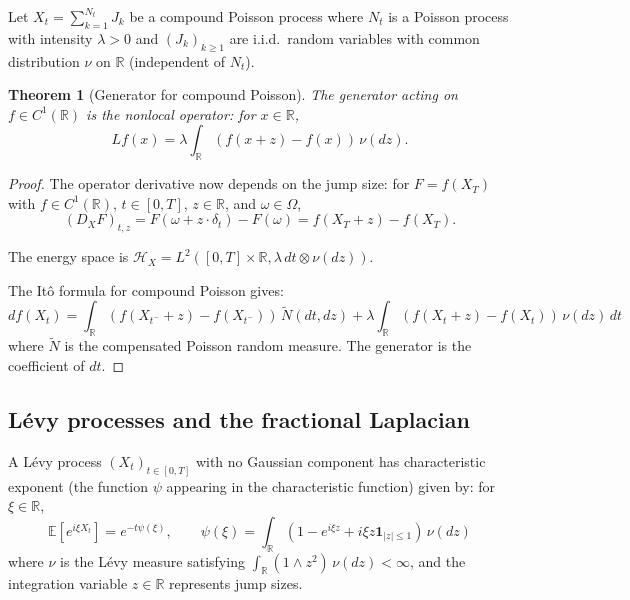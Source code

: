 \documentclass[12pt]{article}
\theoremstyle{plain}
\newtheorem{theorem}{Theorem}[section]
\theoremstyle{definition}
\theoremstyle{remark}
\newcommand{\E}{\mathbb{E}}
\newcommand{\R}{\mathbb{R}}
\newcommand{\HH}{\mathcal{H}}
\begin{document}
Let $X_t = \sum_{k=1}^{N_t} J_k$ be a compound Poisson process where $N_t$ is a Poisson process with intensity $\lambda > 0$ and $(J_k)_{k \geq 1}$ are i.i.d.\ random variables with common distribution $\nu$ on $\R$ (independent of $N_t$).

\begin{theorem}[Generator for compound Poisson]\label{thm:compound-Poisson}
The generator acting on $f \in C^1(\R)$ is the nonlocal operator: for $x \in \R$,
\begin{equation}\label{eq:compound-Poisson-generator}
Lf(x) = \lambda \int_{\R} (f(x+z) - f(x)) \, \nu(dz).
\end{equation}
\end{theorem}

\begin{proof}
The operator derivative now depends on the jump size: for $F = f(X_T)$ with $f \in C^1(\R)$, $t \in [0,T]$, $z \in \R$, and $\omega \in \Omega$,
\begin{equation}\label{eq:compound-Poisson-derivative}
(D_X F)_{t,z} = F(\omega + z \cdot \delta_t) - F(\omega) = f(X_T + z) - f(X_T).
\end{equation}

The energy space is $\HH_X = L^2([0,T] \times \R, \lambda \, dt \otimes \nu(dz))$.

The It\^{o} formula for compound Poisson gives:
\begin{equation}\label{eq:compound-Poisson-ito}
df(X_t) = \int_{\R} (f(X_{t^-} + z) - f(X_{t^-})) \, \tilde{N}(dt, dz) + \lambda \int_{\R} (f(X_t + z) - f(X_t)) \, \nu(dz) \, dt
\end{equation}
where $\tilde{N}$ is the compensated Poisson random measure. The generator is the coefficient of $dt$.
\end{proof}

\subsection{L\'{e}vy processes and the fractional Laplacian}

A L\'{e}vy process $(X_t)_{t \in [0,T]}$ with no Gaussian component has characteristic exponent (the function $\psi$ appearing in the characteristic function) given by: for $\xi \in \R$,
\begin{equation}\label{eq:Levy-char-exp}
\E[e^{i\xi X_t}] = e^{-t\psi(\xi)}, \qquad \psi(\xi) = \int_{\R} (1 - e^{i\xi z} + i\xi z \mathbf{1}_{|z| \leq 1}) \, \nu(dz)
\end{equation}
where $\nu$ is the L\'{e}vy measure satisfying $\int_{\R}(1 \wedge z^2) \, \nu(dz) < \infty$, and the integration variable $z \in \R$ represents jump sizes.
\end{document}
